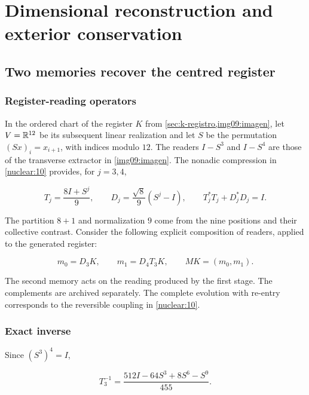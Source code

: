 \section{Dimensional reconstruction and exterior conservation}
\label{nuclear:11}
\subsection{Two memories recover the centred register}

\subsubsection{Register-reading operators}

In the ordered chart of the register \(K\) from \cref{sec:k-registro,img09:imagen}, let \(V=\mathbb R^{12}\) be its subsequent linear realization and let \(S\) be the permutation \((Sx)_i=x_{i+1}\), with indices modulo \(12\). The readers \(I-S^3\) and \(I-S^4\) are those of the transverse extractor in \cref{img09:imagen}. The nonadic compression in \cref{nuclear:10} provides, for \(j=3,4\),

\begin{equation}
T_j=\frac{8I+S^j}{9},\qquad D_j=\frac{\sqrt8}{9}(S^j-I),
\qquad T_j^*T_j+D_j^*D_j=I.
\label{nuc11:eq:1}
\end{equation}

The partition \(8+1\) and normalization \(9\) come from the nine positions and their collective contrast. Consider the following explicit composition of readers, applied to the generated register:

\begin{equation}
m_0=D_3K,\qquad m_1=D_4T_3K,
\qquad M K=(m_0,m_1).
\label{nuc11:eq:2}
\end{equation}

The second memory acts on the reading produced by the first stage. The complements are archived separately. The complete evolution with re-entry corresponds to the reversible coupling in \cref{nuclear:10}.

\subsubsection{Exact inverse}

Since \((S^3)^4=I\),

\begin{equation}
T_3^{-1}=\frac{512I-64S^3+8S^6-S^9}{455}.
\label{nuc11:eq:3}
\end{equation}

